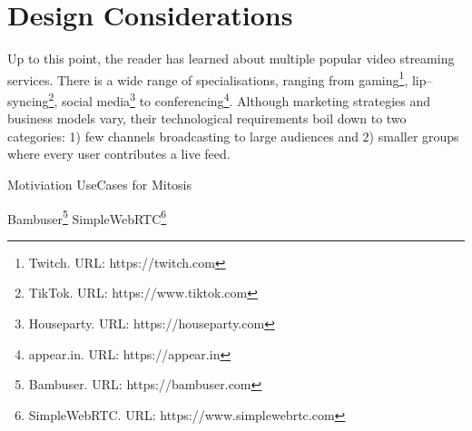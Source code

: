 \section{Design Considerations}

Up to this point, the reader has learned about multiple popular video streaming services. There is a wide range of specialisations, ranging from gaming\footnote{Twitch. URL: {https://twitch.com}}, lip–syncing\footnote{TikTok. URL: {https://www.tiktok.com}}, social media\footnote{Houseparty. URL: {https://houseparty.com}} to conferencing\footnote{appear.in. URL: {https://appear.in}}. Although marketing strategies and business models vary, their technological requirements boil down to two categories: 1) few channels broadcasting to large audiences and 2) smaller groups where every user contributes a live feed.

Motiviation
UseCases for Mitosis

Bambuser\footnote{Bambuser. URL: {https://bambuser.com}}
SimpleWebRTC\footnote{SimpleWebRTC. URL: {https://www.simplewebrtc.com}}
